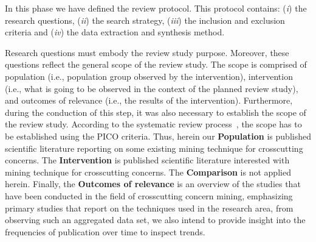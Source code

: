 In this phase we have defined the review protocol. This protocol contains: (\textit{i}) the research questions, (\textit{ii}) the search strategy, (\textit{iii}) the inclusion and exclusion criteria and (\textit{iv}) the data extraction and synthesis method.

Research questions must embody the review study purpose. Moreover, these questions reflect the general scope of the review study. The scope is comprised of population (i.e., population group observed by the intervention), intervention (i.e., what is going to be observed in the context of the planned review study), and outcomes of relevance (i.e., the results of the intervention). Furthermore, during the conduction of this step, it was also necessary to establish the scope of the review study. According to the systematic review process~\cite{Kitchenham}, the scope has to be established using the PICO criteria. Thus, herein our \textbf{Population} is published scientific literature reporting on some existing mining technique for crosscutting concerns. The \textbf{Intervention} is published scientific literature interested with mining technique for crosscutting concerns. The \textbf{Comparison} is not applied herein. Finally, the \textbf{Outcomes of relevance} is an overview of the studies that have been conducted in the field of crosscutting concern mining, emphasizing primary studies that report on the techniques used in the research area, from observing such an aggregated data set, we also intend to provide insight into the frequencies of publication over time to inspect trends.   







